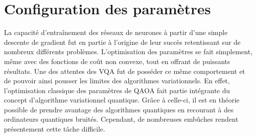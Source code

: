 \section{Configuration des paramètres}
\label{subsec:configuration-des-parametres}

La capacité d'entraînement des réseaux de neurones à partir d'une simple descente de gradient fut en partie à l'origine de leur succès retentissant sur de nombreux différents problèmes. L'optimisation des paramètres se fait simplement, même avec des fonctions de coût non convexe, tout en offrant de puissants résultats. Une des attentes des VQA fut de posséder ce même comportement et de pouvoir ainsi pousser les limites des algorithmes variationnels. En effet, l'optimisation classique des paramètres de QAOA fait partie intégrante du concept d'algorithme variationnel quantique. Grâce à celle-ci, il est en théorie possible de prendre avantage des algorithmes quantiques en recourant à des ordinateurs quantiques bruités. Cependant, de nombreuses embûches rendent présentement cette tâche difficile. 

